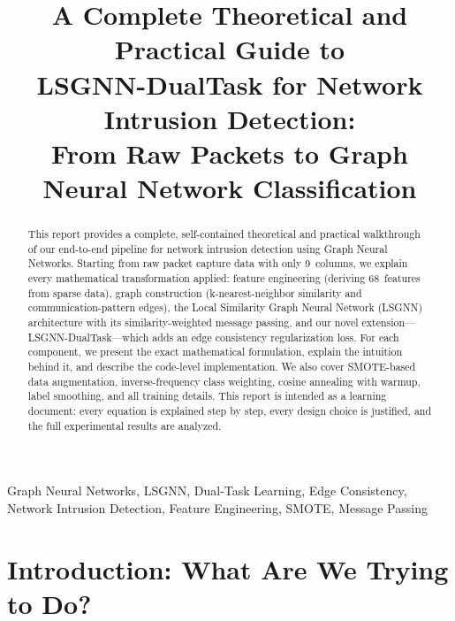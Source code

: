 \documentclass[conference]{IEEEtran}
\begin{document}
\title{A Complete Theoretical and Practical Guide to\\LSGNN-DualTask for Network Intrusion Detection:\\From Raw Packets to Graph Neural Network Classification}

\author{
}

\maketitle

\begin{abstract}
This report provides a complete, self-contained theoretical and practical walkthrough of our end-to-end pipeline for network intrusion detection using Graph Neural Networks. Starting from raw packet capture data with only 9~columns, we explain every mathematical transformation applied: feature engineering (deriving 68~features from sparse data), graph construction (k-nearest-neighbor similarity and communication-pattern edges), the Local Similarity Graph Neural Network (LSGNN) architecture with its similarity-weighted message passing, and our novel extension---LSGNN-DualTask---which adds an edge consistency regularization loss. For each component, we present the exact mathematical formulation, explain the intuition behind it, and describe the code-level implementation. We also cover SMOTE-based data augmentation, inverse-frequency class weighting, cosine annealing with warmup, label smoothing, and all training details. This report is intended as a learning document: every equation is explained step by step, every design choice is justified, and the full experimental results are analyzed.
\end{abstract}

\begin{IEEEkeywords}
Graph Neural Networks, LSGNN, Dual-Task Learning, Edge Consistency, Network Intrusion Detection, Feature Engineering, SMOTE, Message Passing
\end{IEEEkeywords}

\section{Introduction: What Are We Trying to Do?}
\end{document}
